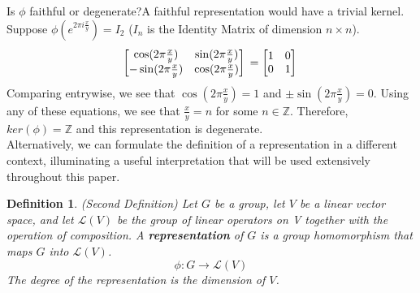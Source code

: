 \documentclass[10pt]{ucthesis}
\newtheorem{definition}{Definition}[chapter]
\begin{document}
	\noindent Is $\phi$ faithful or degenerate?A faithful representation would have a trivial kernel. Suppose $\phi(e^{2\pi i\frac{x}{y}}) = I_2$ ($I_n$ is the Identity Matrix of dimension $n\times n$). 
	\begin{equation}
			\begin{bmatrix}
				\cos(2\pi\frac{x}{y}) & \sin(2\pi\frac{x}{y}) \\
				-\sin(2\pi\frac{x}{y}) & \cos(2\pi\frac{x}{y})
			\end{bmatrix}\\
			= \begin{bmatrix}
				1 & 0 \\
				0 & 1 \\
			\end{bmatrix}\\
	\end{equation}
	\noindent Comparing entrywise, we see that $\cos(2\pi\frac{x}{y}) = 1$ and $\pm\sin(2\pi\frac{x}{y}) = 0$. Using any of these equations, we see that $\frac{x}{y}= n$ for some $n\in\mathbb{Z}$. Therefore, $ker(\phi)=\mathbb{Z}$ and this representation is degenerate.\\


Alternatively, we can formulate the definition of a representation in a different context, illuminating a useful interpretation that will be used extensively throughout this paper.

\begin{definition}
	(Second Definition) Let $G$ be a group, let $V$ be a linear vector space, and let $\mathcal{L}(V)$ be the group of linear operators on V together with the operation of composition. A \textbf{representation} of $G$ is a group homomorphism that maps $G$ into $\mathcal{L}(V)$.
	$$\phi : G \rightarrow \mathcal{L}(V)$$
The degree of the representation is the dimension of $V$.
\end{definition}
\end{document}
